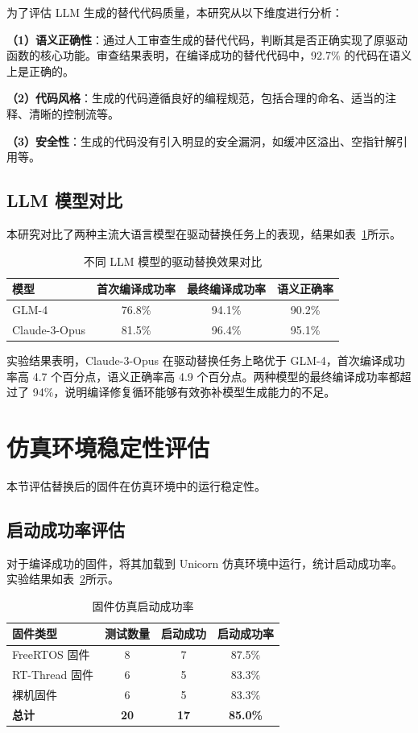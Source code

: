 为了评估 LLM 生成的替代代码质量，本研究从以下维度进行分析：

\textbf{（1）语义正确性}：通过人工审查生成的替代代码，判断其是否正确实现了原驱动函数的核心功能。审查结果表明，在编译成功的替代代码中，92.7\% 的代码在语义上是正确的。

\textbf{（2）代码风格}：生成的代码遵循良好的编程规范，包括合理的命名、适当的注释、清晰的控制流等。

\textbf{（3）安全性}：生成的代码没有引入明显的安全漏洞，如缓冲区溢出、空指针解引用等。

\subsection{LLM 模型对比}

本研究对比了两种主流大语言模型在驱动替换任务上的表现，结果如表~\ref{tab:model_compare}所示。

\begin{table}[htbp]
\centering
\caption{不同 LLM 模型的驱动替换效果对比}
\label{tab:model_compare}
\begin{tabular}{lccc}
\toprule
\textbf{模型} & \textbf{首次编译成功率} & \textbf{最终编译成功率} & \textbf{语义正确率} \\
\midrule
GLM-4 & 76.8\% & 94.1\% & 90.2\% \\
Claude-3-Opus & 81.5\% & 96.4\% & 95.1\% \\
\bottomrule
\end{tabular}
\end{table}

实验结果表明，Claude-3-Opus 在驱动替换任务上略优于 GLM-4，首次编译成功率高 4.7 个百分点，语义正确率高 4.9 个百分点。两种模型的最终编译成功率都超过了 94\%，说明编译修复循环能够有效弥补模型生成能力的不足。

\section{仿真环境稳定性评估}
\label{sec:eval_emu}

本节评估替换后的固件在仿真环境中的运行稳定性。

\subsection{启动成功率评估}

对于编译成功的固件，将其加载到 Unicorn 仿真环境中运行，统计启动成功率。实验结果如表~\ref{tab:emu_results}所示。

\begin{table}[htbp]
\centering
\caption{固件仿真启动成功率}
\label{tab:emu_results}
\begin{tabular}{lccc}
\toprule
\textbf{固件类型} & \textbf{测试数量} & \textbf{启动成功} & \textbf{启动成功率} \\
\midrule
FreeRTOS 固件 & 8 & 7 & 87.5\% \\
RT-Thread 固件 & 6 & 5 & 83.3\% \\
裸机固件 & 6 & 5 & 83.3\% \\
\midrule
\textbf{总计} & \textbf{20} & \textbf{17} & \textbf{85.0\%} \\
\bottomrule
\end{tabular}
\end{table}


